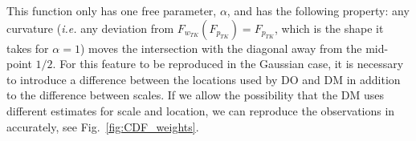 \documentclass[%
	11pt,
	abstract=true,	
	bibliography=oldstyle					%
]{scrartcl}
\newcommand{\eref}[1]{Eq.~(\ref{eq:#1})}
\newcommand{\flabel}[1]{\label{fig:#1}}
\newcommand{\fref}[1]{Fig.~\ref{fig:#1}}
\newcommand{\ie}{\textit{i.e.}\xspace}
\numberwithin{equation}{section}
\begin{document}
This function 
only has one free parameter, $\alpha$, and has the following property: any curvature (\ie any deviation from $F_{w_{TK}}(F_{p_{TK}})=F_{p_{TK}}$, which is the shape it takes for $\alpha=1$) moves the intersection with the diagonal away from the mid-point $1/2$. For this feature to be reproduced in the Gaussian case, it is necessary to introduce a difference between the locations used by DO and DM in addition to the difference between scales. If we allow the possibility that the DM uses different estimates for scale and location, we can reproduce the observations in \parencite{TverskyKahneman1992} accurately, see \fref{CDF_weights}.

\end{document}
